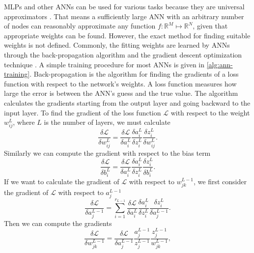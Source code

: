 \glspl{MLP} and other \glspl{ANN} can be used for various tasks because they are universal approximators \cite{cybenkotApproximationSuperpositionsSigmoidal, hornikApproximationCapabilitiesMultilayer1991, hornikMultilayerFeedforwardNetworks1989}.
That means a sufficiently large \gls{ANN} with an arbitrary number of nodes can reasonably approximate any function $f: \mathbb{R}^M \mapsto \mathbb{R}^N$, given that appropriate weights can be found.
However, the exact method for finding suitable weights is not defined.
Commonly, the fitting weights are learned by \glspl{ANN} through the back-propagation algorithm \cite{rumelhartLearningRepresentationsBackpropagating1986} and the gradient descent optimization technique \cite{ruderOverviewGradientDescent2017}.
A simple training procedure for most \glspl{ANN} is given in \autoref{alg:ann-training}.
Back-propagation is the algorithm for finding the gradients of a loss function with respect to the network's weights.
A loss function measures how large the error is between the \gls{ANN}'s guess and the true value.
The algorithm calculates the gradients starting from the output layer and going backward to the input layer.
To find the gradient of the loss function $\mathcal{L}$ with respect to the weight $w_{ij}^L$, where $L$ is the number of layers, we must calculate
\begin{equation}
    \frac{\delta \mathcal{L}}{\delta w_{ij}^L} = \frac{\delta\mathcal{L}}{\delta a_i^L} \frac{\delta a_i^L}{\delta z_i^L} \frac{\delta z_i^L}{\delta w_{ij}^L}.
    \label{eq:backpropagation-ouput-layer-weights}
\end{equation}
Similarly we can compute the gradient with respect to the bias term
\begin{equation}
    \frac{\delta \mathcal{L}}{\delta b_i^L} = \frac{\delta\mathcal{L}}{\delta a_i^L} \frac{\delta a_i^L}{\delta z_i^L} \frac{\delta z_i^L}{\delta b_i^L}.
    \label{eq:backpropagation-ouput-layer-bias}
\end{equation}
If we want to calculate the gradient of $\mathcal{L}$ with respect to $w_{jk}^{L-1}$, we first consider the gradient of $\mathcal{L}$ with respect to $a_j^{L-1}$
\begin{equation}
    \frac{\delta \mathcal{L}}{\delta a_j^{L-1}} = \sum_{i=1}^{r_{L-1}} \frac{\delta\mathcal{L}}{\delta a_i^L} \frac{\delta a_i^L}{\delta z_i^L} \frac{\delta z_i^L}{\delta a_j^{L-1}}.
    \label{eq:backpropagation-hidden-layer-activation}
\end{equation}
Then we can compute the gradients
\begin{equation*}
    \frac{\delta \mathcal{L}}{\delta w_{jk}^{L-1}} = \frac{\delta \mathcal{L}}{\delta a_j^{L-1}} \frac{a_j^{L-1}}{z_j^{L-1}} \frac{z_j^{L-1}}{w_{jk}^{L-1}},
\end{equation*}
